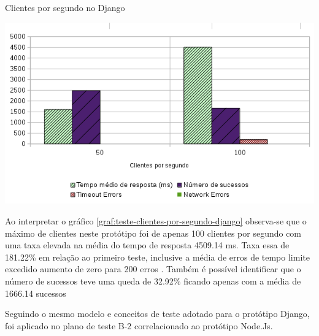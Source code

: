   \begin{grafico}[H]
    \setlength{\abovecaptionskip}{5pt}
    \setlength{\belowcaptionskip}{0pt}

    \caption[Clientes por segundo no Django]
	    {Clientes por segundo no Django}
    \centering
    \includegraphics[width=.80\textwidth]{imagem/graficos/grafico_django_plano_de_teste_2.png}
    \captionsetup[grafico]{justification=centering}
    \label{graf:teste-clientes-por-segundo-django}
  \end{grafico}

  Ao interpretar o gráfico \ref{graf:teste-clientes-por-segundo-django}  observa-se que o máximo de clientes neste protótipo
  foi de apenas 100 clientes por segundo com uma taxa elevada na média do tempo de resposta 4509.14 ms. Taxa essa de 181.22\%
  em relação ao primeiro teste, inclusive a média de erros de tempo limite excedido aumento de zero para 200 erros .
  Também é possível identificar que o número de sucessos teve uma queda de 32.92\% ficando apenas
  com a média de 1666.14 sucessos

  Seguindo o mesmo modelo e conceitos de teste adotado para o protótipo Django, foi aplicado no plano de teste
  B-2 correlacionado ao protótipo Node.Js.

